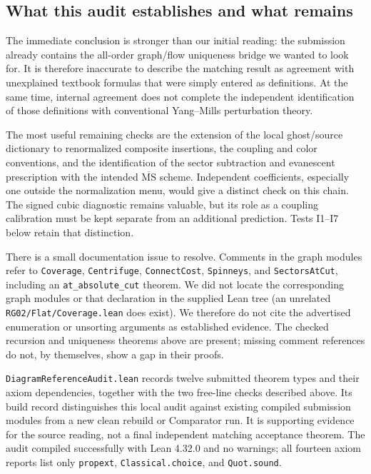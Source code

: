 \documentclass[11pt]{article}
\newcommand{\MS}{\overline{\mathrm{MS}}}
\newcommand{\code}[1]{{\small\nolinkurl{#1}}}
\begin{document}
\subsection{What this audit establishes and what remains}

The immediate conclusion is stronger than our initial reading:
the submission already contains the all-order graph/flow uniqueness
bridge we wanted to look for. It is therefore inaccurate to describe
the matching result as agreement with unexplained textbook formulas
that were simply entered as definitions. At the same time, internal
agreement does not complete the independent identification of those
definitions with conventional Yang--Mills perturbation theory.

The most useful remaining checks are the extension of the local
ghost/source dictionary to renormalized composite insertions,
the coupling and color conventions, and the identification of the
sector subtraction and evanescent prescription with the intended
$\MS$ scheme. Independent coefficients, especially one outside the
normalization menu, would give a distinct check on this chain.
The signed cubic diagnostic remains valuable, but its role as a
coupling calibration must be kept separate from an additional
prediction. Tests I1--I7 below retain that distinction.

There is a small documentation issue to resolve. Comments in the
graph modules refer to \code{Coverage}, \code{Centrifuge},
\code{ConnectCost}, \code{Spinneys}, and \code{SectorsAtCut}, including
an \code{at_absolute_cut} theorem. We did not locate the corresponding
graph modules or that declaration in the supplied Lean tree (an
unrelated \code{RG02/Flat/Coverage.lean} does exist). We therefore do not cite
the advertised enumeration or unsorting arguments as established
evidence. The checked recursion and uniqueness theorems above are
present; missing comment references do not, by themselves, show a
gap in their proofs.

\code{DiagramReferenceAudit.lean} records twelve submitted theorem
types and their axiom dependencies, together with the two free-line
checks described above. Its build record distinguishes this local
audit against existing compiled submission modules from a new clean
rebuild or Comparator run. It is supporting evidence for the source
reading, not a final independent matching acceptance theorem.
The audit compiled successfully with Lean 4.32.0 and no warnings;
all fourteen axiom reports list only \code{propext},
\code{Classical.choice}, and \code{Quot.sound}.
\end{document}
